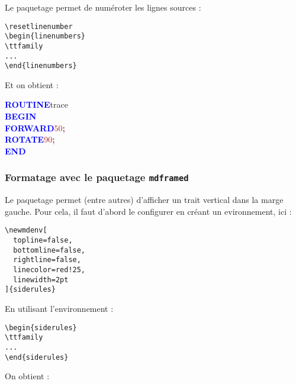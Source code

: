 Le paquetage  permet de numéroter les lignes sources :
\begin{verbatim}
\resetlinenumber
\begin{linenumbers}
\ttfamily
...
\end{linenumbers}
\end{verbatim}

Et on obtient :

\resetlinenumber
\begin{linenumbers}\singlespacing\ttfamily
\textcolor{blue}{\bf ROUTINE}\hspace*{.6em}t{}r{}a{}c{}e{} \\
\textcolor{blue}{\bf BEGIN} \\
\hspace*{1.2em}\textcolor{blue}{\bf FORWARD}\hspace*{.6em}\textcolor{brown}{5{}0{}}\textcolor{brown}{\bf ;} \\
\hspace*{1.2em}\textcolor{blue}{\bf ROTATE}\hspace*{.6em}\textcolor{brown}{9{}0{}}\textcolor{brown}{\bf ;} \\
\textcolor{blue}{\bf END}
\end{linenumbers}

\subsubsection{Formatage avec le paquetage \texttt{mdframed}}

Le paquetage  permet (entre autres) d'afficher un trait vertical dans la marge gauche. Pour cela, il faut d'abord le configurer en créant un evironnement, ici  :

\begin{verbatim}
\newmdenv[
  topline=false,
  bottomline=false,
  rightline=false,
  linecolor=red!25,
  linewidth=2pt
]{siderules}
\end{verbatim}

En utilisant l'environnement  :

\begin{verbatim}
\begin{siderules}
\ttfamily
...
\end{siderules}
\end{verbatim}

On obtient :

